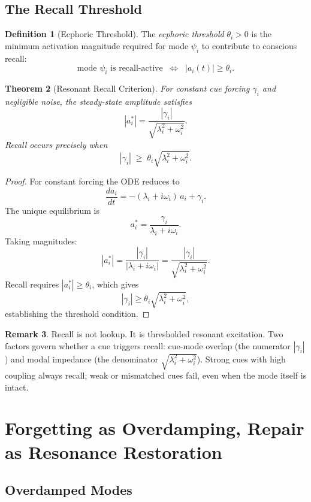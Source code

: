 \documentclass[12pt, oneside]{book}
\theoremstyle{plain}
\newtheorem{theorem}{Theorem}[chapter]
\theoremstyle{definition}
\newtheorem{definition}[theorem]{Definition}
\newtheorem{remark}[theorem]{Remark}
\theoremstyle{remark}
\begin{document}
\section{The Recall Threshold}

\begin{definition}[Ecphoric Threshold]
The \emph{ecphoric threshold} $\theta_i > 0$ is the
minimum activation magnitude required for mode $\psi_i$
to contribute to conscious recall:
\[
  \text{mode } \psi_i \text{ is recall-active}
  \;\;\Longleftrightarrow\;\;
  |a_i(t)| \geq \theta_i.
\]
\end{definition}

\begin{theorem}[Resonant Recall Criterion]
\label{thm:resonant-recall}
For constant cue forcing $\gamma_i$ and negligible noise,
the steady-state amplitude satisfies
\[
  |a_i^*| = \frac{|\gamma_i|}{\sqrt{\lambda_i^2 + \omega_i^2}}.
\]
Recall occurs precisely when
\[
  |\gamma_i| \;\geq\; \theta_i\sqrt{\lambda_i^2 + \omega_i^2}.
\]
\end{theorem}

\begin{proof}
For constant forcing the ODE reduces to
\[
  \frac{d a_i}{dt} = -(\lambda_i + i\omega_i)\,a_i + \gamma_i.
\]
The unique equilibrium is
\[
  a_i^* = \frac{\gamma_i}{\lambda_i + i\omega_i}.
\]
Taking magnitudes:
\[
  |a_i^*|
  = \frac{|\gamma_i|}{|\lambda_i + i\omega_i|}
  = \frac{|\gamma_i|}{\sqrt{\lambda_i^2 + \omega_i^2}}.
\]
Recall requires $|a_i^*| \geq \theta_i$, which gives
\[
  |\gamma_i| \geq \theta_i\sqrt{\lambda_i^2 + \omega_i^2},
\]
establishing the threshold condition.
\end{proof}

\begin{remark}
Recall is not lookup.
It is thresholded resonant excitation.
Two factors govern whether a cue triggers recall:
cue-mode overlap (the numerator $|\gamma_i|$)
and modal impedance (the denominator
$\sqrt{\lambda_i^2 + \omega_i^2}$).
Strong cues with high coupling always recall;
weak or mismatched cues fail, even when the mode itself
is intact.
\end{remark}

\chapter{Forgetting as Overdamping, Repair as Resonance Restoration}

\section{Overdamped Modes}
\end{document}
